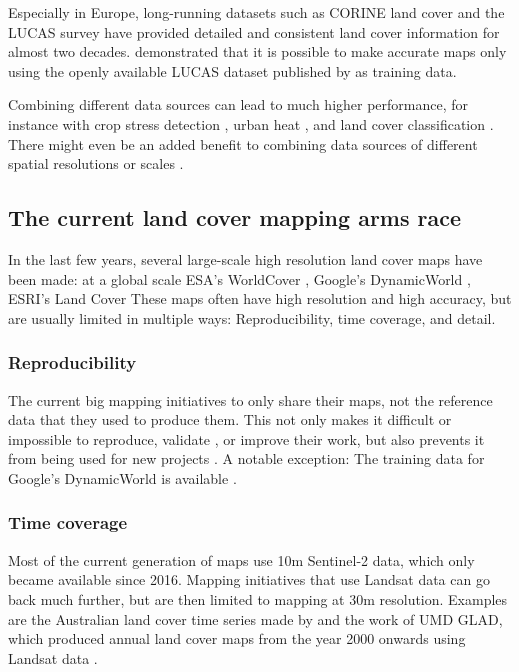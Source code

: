         Especially in Europe, long-running datasets such as CORINE land cover and the LUCAS survey have provided detailed and consistent land cover information for almost two decades. \citet{pflugmacher2019mapping} demonstrated that it is possible to make accurate maps only using the openly available LUCAS dataset published by \citet{dandrimont2020harmonised} as training data.
        
        Combining different data sources can lead to much higher performance, for instance with crop stress detection  \citep{berger2022multi}, urban heat \citep{shahi2015novel}, and land cover classification \citep{zhu2016optimizing, hurskainen2019auxiliary, hosseiny2022urban}. There might even be an added benefit to combining data sources of different spatial resolutions or scales \citep{santos2012multiscale}.
    
\subsection*{The current land cover mapping arms race}
    
    In the last few years, several large-scale high resolution land cover maps have been made: at a global scale ESA's WorldCover \citep{kerchove2021esa}, Google's DynamicWorld \citep{brown2022dynamic}, ESRI's Land Cover \citep{karra2021global}
    These maps often have high resolution and high accuracy, but are usually limited in multiple ways: Reproducibility, time coverage, and detail.
    
    \subsubsection{Reproducibility}
        The current big mapping initiatives to only share their maps, not the reference data that they used to produce them. This not only makes it difficult or impossible to reproduce, validate \citep{venter2022global}, or improve their work, but also prevents it from being used for new projects \citep{tsendbazar2015assessing}.  A notable exception: The training data for Google's DynamicWorld \citet{brown2022dynamic} is available \citep{tait2021dwtd}.
    
    \subsubsection{Time coverage} 
        Most of the current generation of maps use 10m  Sentinel-2 data, which only became available since 2016. Mapping initiatives that use Landsat data can go back much further, but are then limited to mapping at 30m resolution. Examples are the Australian land cover time series made by \citep{calderon2021high} and the work of UMD GLAD, which produced annual land cover maps from the year 2000 onwards using Landsat data \citep{hansen2022global}.


